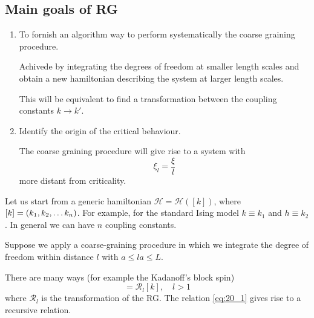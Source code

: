 \documentclass[../main/main.tex]{subfiles}
\begin{document}
\subsection{Main goals of RG}
\begin{enumerate}
\item To fornish an algorithm way to perform systematically the coarse graining procedure.

Achivede by integrating the degrees of freedom at smaller length scales and obtain a new hamiltonian describing the system at larger length scales.

This will be equivalent to find a transformation between the coupling constants \( k \rightarrow k' \).

\item Identify the origin of the critical behaviour.

The coarse graining procedure will give rise to a system with
\begin{equation}
  \xi _l = \frac{\xi }{l}
\end{equation}
more distant from criticality.
\end{enumerate}

Let us start from a generic hamiltonian \( \mathcal{H} = \mathcal{H} ([k]) \), where \( [k] = \qty(k_1,k_2,\dots k_n)  \). For example, for the standard Ising model \( k \equiv k_1 \) and \( h \equiv k_2 \).
In general we can have \( n \) coupling constants.

Suppose we apply a coarse-graining procedure in which we integrate the degree of freedom within distance \( l \) with \( a \le la \le L \).

There are many ways (for example the Kadanoff's block spin)
\begin{equation}
  [k'] = \mathcal{R}_l [k], \quad l > 1
  \label{eq:20_1}
\end{equation}
where \( \mathcal{R}_l \) is the transformation of the RG.
The relation \eqref{eq:20_1} gives rise to a recursive relation.
\end{document}
